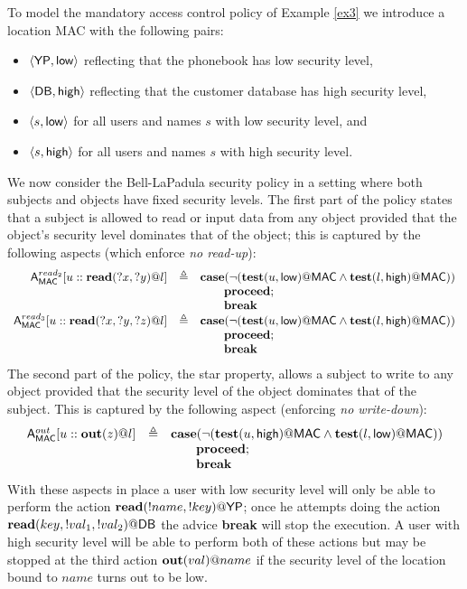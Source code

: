 \documentclass[a4paper]{llncs}
\begin{document}
\begin{example}\label{ex5}
To model the mandatory access control policy of Example \ref{ex3} we introduce a location
{\sf MAC} with the following pairs:
\begin{itemize}
\item $\langle {{\sf YP}}, {\sf low}\rangle$ reflecting that the phonebook has low security level,
\item $\langle {{\sf DB}}, {\sf high}\rangle$ reflecting that the customer database has high 
security level, 
\item $\langle s, {\sf low}\rangle$ for all users and names $s$ with low security level,
and
\item $\langle s, {\sf high}\rangle$ for all users and names $s$ with high security level.
\end{itemize}
We now consider the Bell-LaPadula security policy in a setting where
both subjects and objects have fixed security levels.
The first part of the policy states that a subject is allowed  
to read or input data from any object provided that the object's 
security level dominates 
that of the object; this is captured by the following aspects (which
enforce {\em no read-up}):
$$
\begin{array}{rcl}\small
{\sf A}_{\sf MAC}^{read_2}[u::{\bf read}(?x,?y)@l] 
& \triangleq & {\bf case}(\neg ({\bf test}(u,{\sf low})@{\sf MAC} \wedge 
                                 {\bf test}(l,{\sf high})@{\sf MAC}))\\ 
& & \qquad {\bf proceed};\\
&& \qquad {\bf break} \\
{\sf A}_{\sf MAC}^{read_3}[u::{\bf read}(?x,?y,?z)@l] 
& \triangleq & {\bf case}(\neg ({\bf test}(u,{\sf low})@{\sf MAC} \wedge 
                                 {\bf test}(l,{\sf high})@{\sf MAC}))\\ 
& & \qquad {\bf proceed};\\
&& \qquad {\bf break} \\
\end{array}
$$
The second part of the policy, the star property, allows a subject to write to any 
object provided that the security level of the object dominates that of the subject.
This is captured by the following aspect (enforcing {\em no write-down}):
$$
\begin{array}{rcl}\small
{\sf A}_{\sf MAC}^{out}[u::{\bf out}(z)@l] 
& \triangleq & {\bf case}(\neg ({\bf test}(u,{\sf high})@{\sf MAC} \wedge 
                                 {\bf test}(l,{\sf low})@{\sf MAC}))\\ 
& & \qquad {\bf proceed};\\
&& \qquad {\bf break}
\end{array}
$$
With these aspects in place a user with {\sf low} security level will only be able to
perform the action  ${\bf read}(!name,!key)@{{\sf YP}}$; once he attempts doing the action 
${\bf read}(key,!val_1,!val_2)@{{\sf DB}}$ the advice {\bf break} will stop the execution.
A user with {\sf high} security level will be able to perform both of these actions
but may be stopped at the third action  ${\bf out}(val)@{name}$ if the security level
of the location bound to $name$ turns out to be {\sf low}. 


\end{example}
\end{document}
